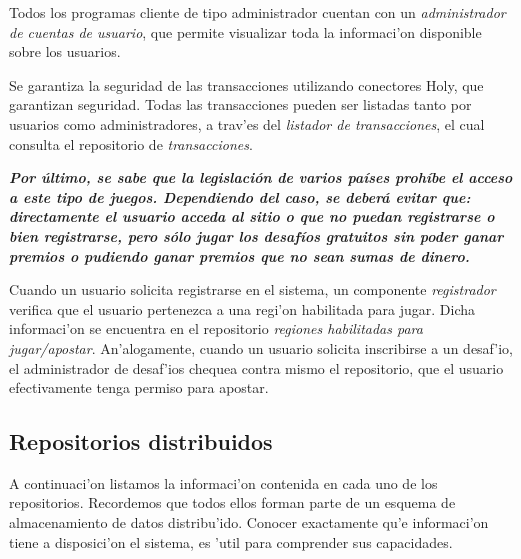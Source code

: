 Todos los programas cliente de tipo administrador cuentan con un \textit{administrador de cuentas de usuario}, que permite visualizar toda la informaci'on disponible sobre los usuarios.

Se garantiza la seguridad de las transacciones utilizando conectores Holy, que garantizan seguridad. Todas las transacciones pueden ser listadas tanto por usuarios como administradores, a trav'es del \textit{listador de transacciones}, el cual consulta el repositorio de \textit{transacciones}.

\textbf{\textit{Por último, se sabe que la legislación de varios países prohíbe el acceso a este tipo de juegos. Dependiendo del caso, se deberá evitar que: directamente el usuario acceda al sitio o que no puedan registrarse o bien registrarse, pero sólo jugar los desafíos gratuitos sin poder ganar premios o pudiendo ganar premios que no sean sumas de dinero.}}

Cuando un usuario solicita registrarse en el sistema, un componente \textit{registrador} verifica que el usuario pertenezca a una regi'on habilitada para jugar. Dicha informaci'on se encuentra en el repositorio \textit{regiones habilitadas para jugar/apostar}. An'alogamente, cuando un usuario solicita inscribirse a un desaf'io, el administrador de desaf'ios chequea contra mismo el repositorio, que el usuario efectivamente tenga permiso para apostar.

\subsection{Repositorios distribuidos}

A continuaci'on listamos la informaci'on contenida en cada uno de los repositorios. Recordemos que todos ellos forman parte de un esquema de almacenamiento de datos distribu'ido. Conocer exactamente qu'e informaci'on tiene a disposici'on el sistema, es 'util para comprender sus capacidades.

